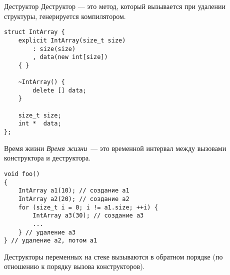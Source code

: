 \documentclass{beamer}
\begin{document}
\begin{frame}[fragile]{Деструктор}
    Деструктор — это метод, который вызывается при удалении структуры,
    генерируется компилятором.
\begin{lstlisting}
struct IntArray {
    explicit IntArray(size_t size)
        : size(size)
        , data(new int[size])
    { }

    ~IntArray() {
        delete [] data;
    }
    
    size_t size;
    int *  data;
};
\end{lstlisting}
\end{frame}

\begin{frame}[fragile]{Время жизни}{}
    {\em Время жизни}~--- это временной интервал 
    между вызовами конструктора и деструктора.
\begin{lstlisting}
void foo()
{
    IntArray a1(10); // создание a1
    IntArray a2(20); // создание a2 
    for (size_t i = 0; i != a1.size; ++i) {
        IntArray a3(30); // создание a3
        ...
    } // удаление a3
} // удаление a2, потом a1
\end{lstlisting}
Деструкторы переменных на стеке вызываются в обратном
порядке (по отношению к порядку вызова конструкторов).
\end{frame}
\end{document}
